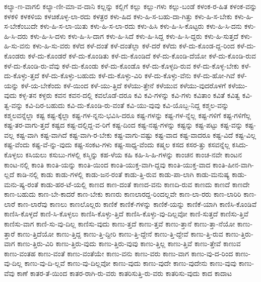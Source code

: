 {ಕಲ್ಯಾ-ಣ-ವಾಗಲಿ
ಕಲ್ಯಾ-ಣೀ-ಮಾ-ವ-ದಾನಿ
ಕಲ್ಲನ್ನು
ಕಲ್ಲಿಗೆ
ಕಲ್ಲು
ಕಲ್ಲು-ಗಳು
ಕಲ್ಲು-ಬಂಡೆ
ಕಳಂಕ-ರ-ಹಿತ
ಕಳಂಕ-ವನ್ನು
ಕಳಕಳಿ
ಕಳಕಳಿಯ
ಕಳಚಿಕೊಳ್ಳ-ಲಾ-ರದು
ಕಳತ್ರರ
ಕಳು-ಹಿದ
ಕಳು-ಹಿ-ಸ-ಬಹು-ದಾ-ಗಿತ್ತು
ಕಳು-ಹಿ-ಸ-ಬೇಕು
ಕಳು-ಹಿ-ಸ-ಬೇಕೆಂಬುದೇ
ಕಳು-ಹಿ-ಸ-ಲಾ-ಯಿತು
ಕಳು-ಹಿ-ಸ-ಲಾ-ರದು
ಕಳು-ಹಿಸಿ
ಕಳು-ಹಿ-ಸಿ-ಕೊಟ್ಟರು
ಕಳು-ಹಿ-ಸಿ-ದನು
ಕಳು-ಹಿ-ಸಿ-ದರು
ಕಳು-ಹಿ-ಸಿ-ದಳು
ಕಳು-ಹಿ-ಸಿ-ದಾಗ
ಕಳು-ಹಿ-ಸಿದೆ
ಕಳು-ಹಿ-ಸಿದ್ದ
ಕಳು-ಹಿ-ಸಿ-ದ್ದರು
ಕಳು-ಹಿ-ಸುತ್ತದೆ
ಕಳು-ಹಿ-ಸು-ವನು
ಕಳು-ಹಿ-ಸು-ವರು
ಕಳೆದ
ಕಳೆ-ದಂತೆ
ಕಳೆ-ದಂತೆಲ್ಲಾ
ಕಳೆ-ದರೆ
ಕಳೆದು
ಕಳೆ-ದು-ಕೊಂಡ-ದ್ದ-ರಿಂದ
ಕಳೆ-ದು-ಕೊಂಡರು
ಕಳೆ-ದು-ಕೊಂಡರೆ
ಕಳೆ-ದು-ಕೊಂಡಿತು
ಕಳೆ-ದು-ಕೊಂಡಿದೆ
ಕಳೆ-ದು-ಕೊಂಡಿ-ದೆಯೋ
ಕಳೆ-ದು-ಕೊಂಡಿ-ರುವ
ಕಳೆ-ದು-ಕೊಂಡಿ-ರು-ವೆವು
ಕಳೆ-ದು-ಕೊಂಡು
ಕಳೆ-ದು-ಕೊಂಡೊ
ಕಳೆ-ದು-ಕೊಳ್ಳದಿ-ರುವ
ಕಳೆ-ದು-ಕೊಳ್ಳ-ಬೇಕು
ಕಳೆ-ದು-ಕೊಳ್ಳು-ತ್ತದೆ
ಕಳೆ-ದು-ಕೊಳ್ಳು-ಬಹುದು
ಕಳೆ-ದು-ಕೊಳ್ಳು-ವಿರಿ
ಕಳೆ-ದು-ಕೊಳ್ಳು-ವೆನು
ಕಳೆ-ದು-ಹೋ-ಗಿವೆ
ಕಳೆ-ಯನ್ನು
ಕಳೆ-ಯ-ಬೇಕೆಂದು
ಕಳೆ-ಯಿಂದ
ಕಳೆ-ಯು-ತ್ತಿದೆ
ಕಳೆಯು-ತ್ತೇನೆ
ಕಳೆಯುವ
ಕಳೆಯು-ವುದರೊಳಗೆ
ಕಳೆಯು-ವುದು
ಕಳ್ಳ-ತನ
ಕಳ್ಳರು
ಕವನ
ಕವನ-ದಲ್ಲಿ
ಕವಲೊಡೆ-ದರೂ
ಕವಿ
ಕವಿ-ಗಳನ್ನು
ಕವಿ-ಗಳು
ಕವಿತಾಂ
ಕವಿತೆ
ಕವಿತ್ವ
ಕವಿ-ತ್ವ-ವನ್ನು
ಕವಿ-ದಿರ-ಬಹುದು
ಕವಿ-ದು-ಕೊಂಡಿ-ರು-ವಂತೆ
ಕವಿ-ಯು-ವುವು
ಕವಿ-ಯೊಬ್ಬ-ನಿದ್ದ
ಕಶ್ಮಲ-ವನ್ನು
ಕಶ್ಮಲವನ್ನೆಲ್ಲಾ
ಕಷ್ಟ
ಕಷ್ಟ-ಕ್ಕೆಲ್ಲಾ
ಕಷ್ಟ-ಗಳ-ನ್ನನು-ಭವಿಸಿ-ದರೂ
ಕಷ್ಟ-ಗಳನ್ನು
ಕಷ್ಟ-ಗಳ-ನ್ನೆಲ್ಲ
ಕಷ್ಟ-ಗಳಿಗೆ
ಕಷ್ಟ-ಗಳಿಗೆಲ್ಲ
ಕಷ್ಟ-ತರ-ವಾಗು-ತ್ತದೆ
ಕಷ್ಟದ
ಕಷ್ಟ-ದಲ್ಲಿದ್ದ-ವ-ರಿಗೆ
ಕಷ್ಟ-ದಿಂದ
ಕಷ್ಟ-ನಷ್ಟ-ಗಳನ್ನು
ಕಷ್ಟನ್ನು
ಕಷ್ಟ-ಪಟ್ಟು
ಕಷ್ಟ-ವನ್ನು
ಕಷ್ಟ-ವಲ್ಲ
ಕಷ್ಟ-ವಾಗಿ
ಕಷ್ಟ-ವಾಗಿದೆ
ಕಷ್ಟ-ವಾಗಿ-ರ-ಬೇಕು
ಕಷ್ಟ-ವಾಗು-ವಷ್ಟು
ಕಷ್ಟ-ವಾದ
ಕಷ್ಟ-ವಾದರೂ
ಕಷ್ಟ-ವಿದೆ
ಕಷ್ಟ-ವಿಲ್ಲ
ಕಷ್ಟ-ವೆಂದು
ಕಷ್ಟ-ವೆ-ನ್ನು-ವುದು
ಕಷ್ಟ-ಸಂಕಟ-ಗಳು
ಕಷ್ಟ-ಸಾಧ್ಯ-ವೆಂದು
ಕಷ್ಮಲ
ಕಸದ
ಕಸರ-ತ್ತು
ಕಸವನ್ನೆಲ್ಲ
ಕಸಿದು-ಕೊಳ್ಳಲು
ಕಸಿಯಲು
ಕಸುಬು-ಗಳಲ್ಲಿ
ಕಸ್ಮಿನ್ನು
ಕಹ-ಳೆಯ
ಕಹಿ
ಕಹಿ-ಸಿ-ಹಿ-ಗಳನ್ನು
ಕಾಂಚನ
ಕಾಂಚ-ನವೇ
ಕಾಂಟನ
ಕಾಂಟ-ನಲ್ಲಿ
ಕಾಂತಿ
ಕಾಂತಿ-ಯನ್ನು
ಕಾಂತಿ-ಯಿಂದ
ಕಾಂತಿ-ಯುಕ್ತ-ವಾಗಿ-ದ್ದವು
ಕಾಂತಿ-ಯುಕ್ತ-ವಾದ
ಕಾಂತಿ-ಹೀನ-ವಾಗಿ-ಲ್ಲದೆ
ಕಾಡಿ-ನಲ್ಲಿ
ಕಾಡು
ಕಾಡು-ಗಳಲ್ಲಿ
ಕಾಡು-ಜನ-ರಂತೆ
ಕಾಡು-ತ್ತಿ-ರುವ
ಕಾಡು-ಪಾ-ಲಾಗಿ
ಕಾಡು-ಮನುಷ್ಯ
ಕಾಡು-ಮನು-ಷ್ಯ-ರಂತೆ
ಕಾಡು-ಹರ-ಟೆ-ಯಲ್ಲಿ
ಕಾಣದ
ಕಾಣ-ದಂತೆ
ಕಾಣದ-ವನು
ಕಾಣದಿ-ರುವ
ಕಾಣದು
ಕಾಣದೆ
ಕಾಣದೇ
ಕಾಣ-ಬಹುದು
ಕಾಣ-ಬೇ-ಕಾದರೆ
ಕಾಣ-ಬೇಕು
ಕಾಣರು
ಕಾಣಲಾರದ್ದ-ರಿಂದಲ್ಲವೇ
ಕಾಣ-ಲಾ-ರರು
ಕಾಣ-ಲಾರಿರಿ
ಕಾಣ-ಲಾರೆ
ಕಾಣ-ಲಾರೆವು
ಕಾಣಲು
ಕಾಣಲೊಲ್ಲರು
ಕಾಣಿಕೆ
ಕಾಣಿಕೆ-ಗಳನ್ನು
ಕಾಣಿಕೆ-ಯನ್ನು
ಕಾಣಿಕೆ-ಯಾಗಿ
ಕಾಣಿಸಿ-ಕೊಂಡಿವೆ
ಕಾಣಿಸಿ-ಕೊಳ್ಳದೆ
ಕಾಣಿ-ಸಿ-ಕೊಳ್ಳಲು
ಕಾಣಿಸಿ-ಕೊಳ್ಳು-ತ್ತಿದೆ
ಕಾಣಿಸಿ-ಕೊಳ್ಳು-ವು-ದಿಲ್ಲವೋ
ಕಾಣಿ-ಸುತ್ತದೆ
ಕಾಣಿಸು-ತ್ತಿವೆ
ಕಾಣಿಸು-ವಾಗ
ಕಾಣಿ-ಸು-ವು-ದಿಲ್ಲ
ಕಾಣಿಸು-ವುದು
ಕಾಣು-ತ್ತದೆ
ಕಾಣು-ತ್ತವೆ
ಕಾಣು-ತ್ತಾನೆ
ಕಾಣು-ತ್ತಾ-ನೆಯೋ
ಕಾಣು-ತ್ತಾರೆ
ಕಾಣು-ತ್ತಿದೆಯೋ
ಕಾಣು-ತ್ತಿದ್ದ
ಕಾಣು-ತ್ತಿ-ದ್ದೀರಿ
ಕಾಣು-ತ್ತಿ-ದ್ದೇನೆ
ಕಾಣು-ತ್ತಿ-ದ್ದೇವೆ
ಕಾಣು-ತ್ತಿ-ರುವ
ಕಾಣು-ತ್ತಿರು-ವಾಗ
ಕಾಣು-ತ್ತಿರು-ವಿರಿ
ಕಾಣು-ತ್ತಿರು-ವುದು
ಕಾಣು-ತ್ತಿರು-ವುವು
ಕಾಣು-ತ್ತಿಲ್ಲ
ಕಾಣು-ತ್ತಿವೆ
ಕಾಣು-ತ್ತೇವೆ
ಕಾಣುವ
ಕಾಣು-ವಂತಹ
ಕಾಣು-ವಂತೆ
ಕಾಣು-ವಂತೆಯೇ
ಕಾಣು-ವನು
ಕಾಣು-ವರು
ಕಾಣು-ವಾಗ
ಕಾಣು-ವು-ದ-ರಿಂದ
ಕಾಣು-ವು-ದಿಲ್ಲ
ಕಾಣು-ವು-ದಿ-ಲ್ಲವೆ
ಕಾಣು-ವು-ದಿಲ್ಲವೋ
ಕಾಣು-ವುದು
ಕಾಣು-ವುದೇ
ಕಾಣು-ವುದೇನು
ಕಾಣು-ವುವು
ಕಾಣು-ವೆವು
ಕಾಣೆ
ಕಾತರ-ತೆ-ಯಿಂದ
ಕಾತರ-ರಾಗಿ-ರು-ವರು
ಕಾತರಿಸುತ್ತಿ-ರು-ವರು
ಕಾತರಿಸು-ವುದು
ಕಾದ
ಕಾದಾಟ
}
